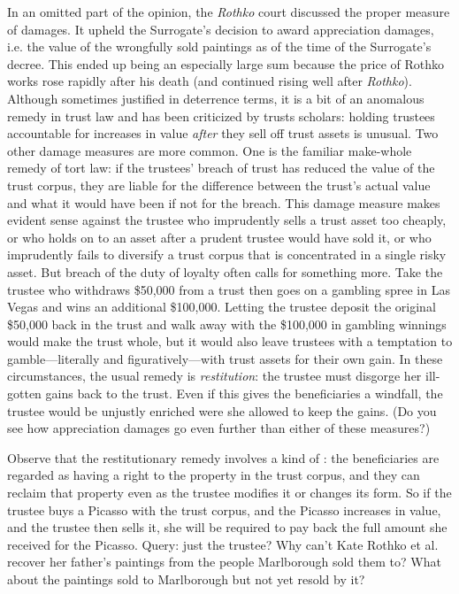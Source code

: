\item In an omitted part of the opinion, the \textit{Rothko} court discussed the
proper measure of damages. It upheld the Surrogate's decision to award
appreciation damages, i.e. the value of the wrongfully sold paintings as of the
time of the Surrogate's decree. This ended up being an especially large sum
because the price of Rothko works rose rapidly after his death (and continued
rising well after \textit{Rothko}). Although sometimes justified in deterrence
terms, it is a bit of an anomalous remedy in trust law and has been criticized
by trusts scholars: holding trustees accountable for increases in value
\textit{after} they sell off trust assets is unusual. Two other damage measures
are more common. One is the familiar make-whole remedy of tort law: if the
trustees' breach of trust has reduced the value of the trust corpus, they are
liable for the difference between the trust's actual value and what it would
have been if not for the breach. This damage measure makes evident sense against
the trustee who imprudently sells a trust asset too cheaply, or who holds on to
an asset after a prudent trustee would have sold it, or who imprudently fails to
diversify a trust corpus that is concentrated in a single risky asset. But
breach of the duty of loyalty often calls for something more. Take the trustee
who withdraws \$50,000 from a trust then goes on a gambling spree in Las Vegas
and wins an additional \$100,000. Letting the trustee deposit the original
\$50,000 back in the trust and walk away with the \$100,000 in gambling winnings
would make the trust whole, but it would also leave trustees with a temptation
to gamble---literally and figuratively---with trust assets for their own
gain. In these circumstances, the usual remedy is \textit{restitution}: the
trustee must disgorge her ill-gotten gains back to the trust. Even if this gives
the beneficiaries a windfall, the trustee would be unjustly enriched were she
allowed to keep the gains. (Do you see how appreciation damages go even further
than either of these measures?) 


Observe that the restitutionary remedy involves a kind of : the
beneficiaries are regarded as having a right to the property in the trust
corpus, and they can reclaim that property even as the trustee modifies it or
changes its form. So if the trustee buys a Picasso with the trust corpus, and
the Picasso increases in value, and the trustee then sells it, she will be
required to pay back the full amount she received for the Picasso. Query: just
the trustee? Why can't Kate Rothko et al. recover her father's paintings from
the people Marlborough sold them to? What about the paintings sold to
Marlborough but not yet resold by it?


